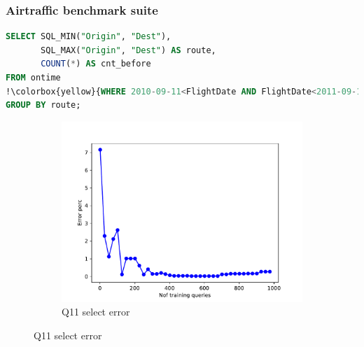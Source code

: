 \begin{frame}[fragile]
\frametitle{Airtraffic benchmark suite}
\begin{lstlisting}[basicstyle=\ttfamily\footnotesize, language=SQL,escapechar=!]
SELECT SQL_MIN("Origin", "Dest"),
       SQL_MAX("Origin", "Dest") AS route,
       COUNT(*) AS cnt_before
FROM ontime
!\colorbox{yellow}{WHERE 2010-09-11<FlightDate AND FlightDate<2011-09-11}!
GROUP BY route;
\end{lstlisting}
	\begin{figure}[!htb]
	  \begin{subfigure}[t]{0.5\textwidth}
	    \includegraphics[scale=0.4]{../figs/airtraffic/airtraffic_sel11_error.pdf}
	    \caption{Q11 select error}
	    \label{fig:sel04}
	  \end{subfigure}
	\end{figure}
\end{frame}

